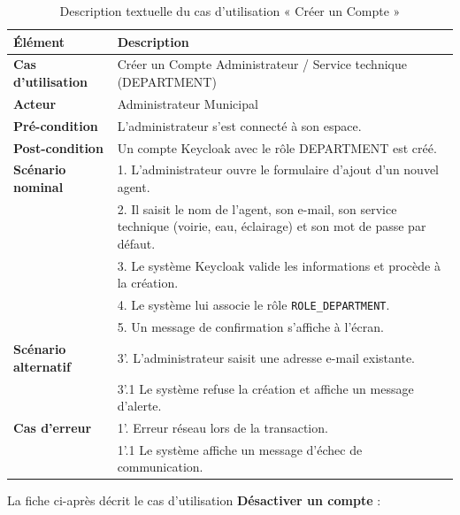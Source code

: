 \begin{table}[H]
    \centering
    \caption{Description textuelle du cas d'utilisation « Créer un Compte »}
    \label{tab:txt_creer_compte}
    \vspace{0.2cm}
    \small
    \begin{tabularx}{\textwidth}{|l|X|}
        \hline
        \textbf{Élément} & \textbf{Description} \\ \hline
        \textbf{Cas d’utilisation} & Créer un Compte Administrateur / Service technique (DEPARTMENT) \\ \hline
        \textbf{Acteur} & Administrateur Municipal \\ \hline
        \textbf{Pré-condition} & L'administrateur s'est connecté à son espace. \\ \hline
        \textbf{Post-condition} & Un compte Keycloak avec le rôle DEPARTMENT est créé. \\ \hline
        \textbf{Scénario nominal} &
        1. L'administrateur ouvre le formulaire d'ajout d'un nouvel agent.\\
        & 2. Il saisit le nom de l'agent, son e-mail, son service technique (voirie, eau, éclairage) et son mot de passe par défaut.\\
        & 3. Le système Keycloak valide les informations et procède à la création.\\
        & 4. Le système lui associe le rôle \texttt{ROLE\_DEPARTMENT}.\\
        & 5. Un message de confirmation s'affiche à l'écran. \\ \hline
        \textbf{Scénario alternatif} &
        3'. L'administrateur saisit une adresse e-mail existante.\\
        & 3'.1 Le système refuse la création et affiche un message d'alerte. \\ \hline
        \textbf{Cas d’erreur} &
        1'. Erreur réseau lors de la transaction.\\
        & 1'.1 Le système affiche un message d'échec de communication. \\ \hline
    \end{tabularx}
\end{table}

La fiche ci-après décrit le cas d'utilisation \textbf{\og Désactiver un compte \fg{}} :

